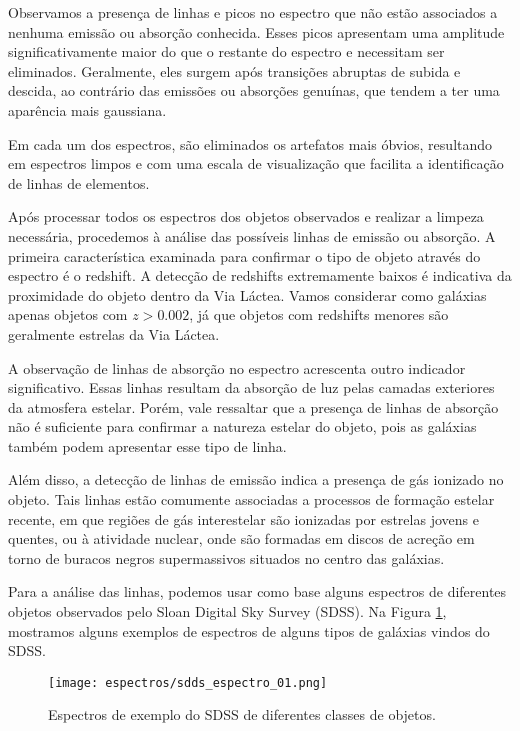Observamos a presença de linhas e picos no espectro que não estão associados a nenhuma emissão ou absorção conhecida. Esses picos apresentam uma amplitude significativamente maior do que o restante do espectro e necessitam ser eliminados. Geralmente, eles surgem após transições abruptas de subida e descida, ao contrário das emissões ou absorções genuínas, que tendem a ter uma aparência mais gaussiana.

Em cada um dos espectros, são eliminados os artefatos mais óbvios, resultando em espectros limpos e com uma escala de visualização que facilita a identificação de linhas de elementos.

Após processar todos os espectros dos objetos observados e realizar a limpeza necessária, procedemos à análise das possíveis linhas de emissão ou absorção. A primeira característica examinada para confirmar o tipo de objeto através do espectro é o redshift. A detecção de redshifts extremamente baixos é indicativa da proximidade do objeto dentro da Via Láctea. Vamos considerar como galáxias apenas objetos com $z > 0.002$, já que objetos com redshifts menores são geralmente estrelas da Via Láctea.

A observação de linhas de absorção no espectro acrescenta outro indicador significativo. Essas linhas resultam da absorção de luz pelas camadas exteriores da atmosfera estelar. Porém, vale ressaltar que a presença de linhas de absorção não é suficiente para confirmar a natureza estelar do objeto, pois as galáxias também podem apresentar esse tipo de linha.

Além disso, a detecção de linhas de emissão indica a presença de gás ionizado no objeto. Tais linhas estão comumente associadas a processos de formação estelar recente, em que regiões de gás interestelar são ionizadas por estrelas jovens e quentes, ou à atividade nuclear, onde são formadas em discos de acreção em torno de buracos negros supermassivos situados no centro das galáxias.

Para a análise das linhas, podemos usar como base alguns espectros de diferentes objetos observados pelo Sloan Digital Sky Survey (SDSS). Na Figura \ref{sdds_espectro}, mostramos alguns exemplos de espectros de alguns tipos de galáxias vindos do SDSS.

\begin{figure}[!ht]
    \begin{center}
    \texttt{[image: espectros/sdds\_espectro\_01.png]}
    \caption[]{Espectros de exemplo do SDSS de diferentes classes de objetos.}
    \label{sdds_espectro}
    \end{center}
\end{figure}    

